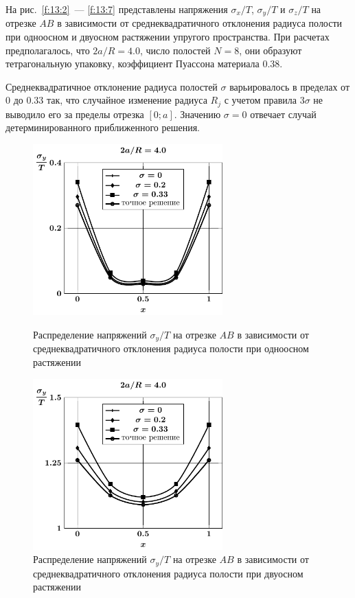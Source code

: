 На рис.~\ref{f:13:2}~--- \ref{f:13:7} представлены напряжения $\sigma_x/T$, $\sigma_y/T$ и $\sigma_z/T$ на отрезке $AB$ в зависимости от среднеквадратичного отклонения радиуса полости при одноосном и двуосном растяжении упругого пространства.
При расчетах предполагалось, что $2a/R=4.0$, число полостей $N=8$, они образуют тетрагональную упаковку, коэффициент Пуассона материала $0.38$.

Среднеквадратичное отклонение радиуса полостей $\sigma$ варьировалось в пределах от 0 до 0.33 так, что случайное изменение радиуса $R_j$ с учетом правила $3\sigma$ не выводило его за пределы отрезка $[0;a]$. Значению $\sigma=0$ отвечает случай детерминированного приближенного решения.

\begin{figure}[h!]
\centering\footnotesize
\parbox[b]{7.5cm}{\centering\includegraphics[width=7.3cm]{spheres-cav8-t1-sig_y-stoch.pdf}
\caption{Распределение напряжений $\sigma_y/T$ на отрезке $AB$ в зависимости от среднеквадратичного отклонения радиуса полости при одноосном растяжении 
\label{f:13:4}}}\hfil\hfil
\parbox[b]{7.5cm}{\centering\includegraphics[width=7.3cm]{spheres-cav8-t2-sig_y-stoch.pdf}
\caption{Распределение напряжений $\sigma_y/T$ на отрезке $AB$ в зависимости от среднеквадратичного отклонения радиуса полости при двуосном растяжении
\label{f:13:5}}}
\end{figure}

